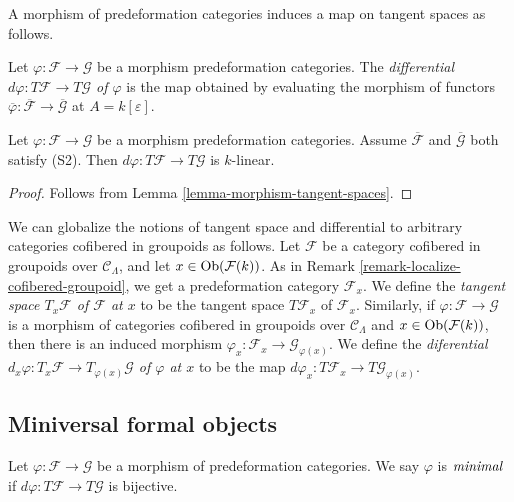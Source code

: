 \noindent
A morphism of predeformation categories induces a map on tangent spaces as 
follows.

\begin{definition}
\label{definition-differential}
Let $\varphi: \mathcal F \rightarrow \mathcal G$ be a morphism predeformation 
categories. The \emph{differential $d \varphi: T \mathcal F \rightarrow T 
\mathcal G$ of $\varphi$} is the map obtained by evaluating the morphism of 
functors $\overline{\varphi}: \overline{\mathcal F} \rightarrow  
\overline{\mathcal G}$ at $A = k[\varepsilon]$.
\end{definition}

\begin{lemma}
Let $\varphi: \mathcal F \rightarrow \mathcal G$ be a morphism predeformation 
categories. Assume $\overline{\mathcal F}$ and $\overline{\mathcal G}$ both 
satisfy \textnormal{(S2)}.  Then $d \varphi: T \mathcal F \rightarrow T 
\mathcal G$ is $k$-linear.
\end{lemma}

\begin{proof}
Follows from Lemma \ref{lemma-morphism-tangent-spaces}.
\end{proof}

\begin{remark}
\label{remark-tangent-space-cofibered-groupoid}
We can globalize the notions of tangent space and differential to arbitrary 
categories cofibered in groupoids as follows. Let $\mathcal F$ be a category 
cofibered in groupoids over $\mathcal C_{\Lambda}$, and let $x \in 
\textnormal{Ob}(\mathcal F(k))$.  As in Remark 
\ref{remark-localize-cofibered-groupoid}, we get a predeformation category 
$\mathcal F_x$.  We define the \emph{tangent space $T_x \mathcal F$ of 
$\mathcal F$ at $x$} to be the tangent space $T \mathcal F_x$ of $\mathcal 
F_x$.  Similarly, if $\varphi: \mathcal F \rightarrow \mathcal G$ is a morphism 
of categories cofibered in groupoids over $\mathcal C_{\Lambda}$ and $x \in 
\textnormal{Ob}(\mathcal F(k))$, then there is an induced morphism $\varphi_x: 
\mathcal F_x \rightarrow \mathcal G_{\varphi(x)}$.  We define the 
\emph{diferential $d_{x} \varphi: T_{x} \mathcal F \rightarrow T_{\varphi(x)} 
\mathcal G$ of $\varphi$ at $x$} to be the map $d \varphi_x: T \mathcal F_x 
\rightarrow T \mathcal G_{\varphi(x)}$.
\end{remark}

\subsection{Miniversal formal objects}
\label{subsection-miniversal-objects-existence}
\begin{definition}
\label{definition-minimal-morphism}
Let $\varphi: \mathcal F \rightarrow \mathcal G$ be a morphism of 
predeformation categories.  We say $\varphi$ is $\emph{minimal}$ if $d \varphi: 
 T \mathcal F \rightarrow T \mathcal G$ is bijective.
\end{definition}


